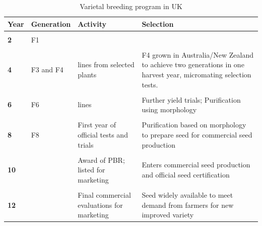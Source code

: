 \documentclass[
  ignorenonframetext,
  aspectratio=169]{beamer}
\begin{document}
\begin{frame}{}
\protect\hypertarget{section-1}{}
\begin{table}

\caption{\label{tab:uk-cereal-breeding}Varietal breeding program in UK}
\centering
\fontsize{6}{8}\selectfont
\begin{tabular}[t]{>{\raggedright\arraybackslash}p{3em}>{\raggedright\arraybackslash}p{5em}>{\raggedright\arraybackslash}p{20em}>{\raggedright\arraybackslash}p{24em}}
\toprule
Year & Generation & Activity & Selection\\
\midrule
\textbf{\cellcolor{gray!6}{1}} & \cellcolor{gray!6}{Initial cross} & \cellcolor{gray!6}{Malting quality x disease resistance} & \cellcolor{gray!6}{Choice of parents often based upon existing varieties that are commercially successful}\\
\textbf{2} & F1 &  & \\
\textbf{\cellcolor{gray!6}{3}} & \cellcolor{gray!6}{F2} & \cellcolor{gray!6}{2000 single plants} & \cellcolor{gray!6}{Selection for disease resistance by deliberate infection}\\
\textbf{4} & F3 and F4 & 100 lines from selected plants & F4 grown in Australia/New Zealand to achieve two generations in one harvest year, micromating selection tests.\\
\textbf{\cellcolor{gray!6}{5}} & \cellcolor{gray!6}{F5} & \cellcolor{gray!6}{8 lines from selected plants} & \cellcolor{gray!6}{Replicated yield trials, malting tests, purification using morphology and protein electrophoresis.}\\
\addlinespace
\textbf{6} & F6 & 4 lines & Further yield trials; Purification using morphology\\
\textbf{\cellcolor{gray!6}{7}} & \cellcolor{gray!6}{F7} & \cellcolor{gray!6}{Plants from lines harvested and grown as plant or ear rows; harvested seed bulked} & \cellcolor{gray!6}{Final breeders performance evaluation trials; purification by morphology/protein electrophoresis; seed bulked for official tests and trials}\\
\textbf{8} & F8 & First year of official tests and trials & Purification based on morphology to prepare seed for commercial seed production\\
\textbf{\cellcolor{gray!6}{9}} & \cellcolor{gray!6}{} & \cellcolor{gray!6}{Second year of official tests and trials} & \cellcolor{gray!6}{Preliminary certification for seed production; purification based on morphology}\\
\textbf{10} &  & Award of PBR; listed for marketing & Enters commercial seed production and official seed certification\\
\addlinespace
\textbf{\cellcolor{gray!6}{11}} & \cellcolor{gray!6}{} & \cellcolor{gray!6}{Further commercial evaluations for marketing} & \cellcolor{gray!6}{Limited seed available to farmers}\\
\textbf{12} &  & Final commercial evaluations for marketing & Seed widely available to meet demand from farmers for new improved variety\\
\bottomrule
\end{tabular}
\end{table}
\end{frame}
\end{document}
